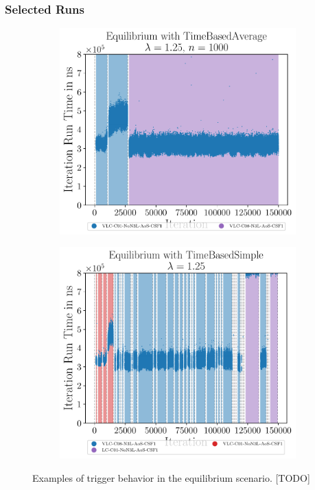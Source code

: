 \subsubsection{Selected Runs}
\begin{figure}[htpb]
	\begin{subfigure}{0.5\textwidth}
		\centering
		\includegraphics[width=\textwidth]{./Figures/plots/equilibrium_configs_good.pdf}
	\end{subfigure}
	\begin{subfigure}{0.5\textwidth}
		\centering
		\includegraphics[width=\textwidth]{./Figures/plots/equilibrium_configs_bad.pdf}
	\end{subfigure}
	\caption{Examples of trigger behavior in the equilibrium scenario. [TODO]}
	\label{fig:equilibrium_trigger_behavior}
\end{figure}

